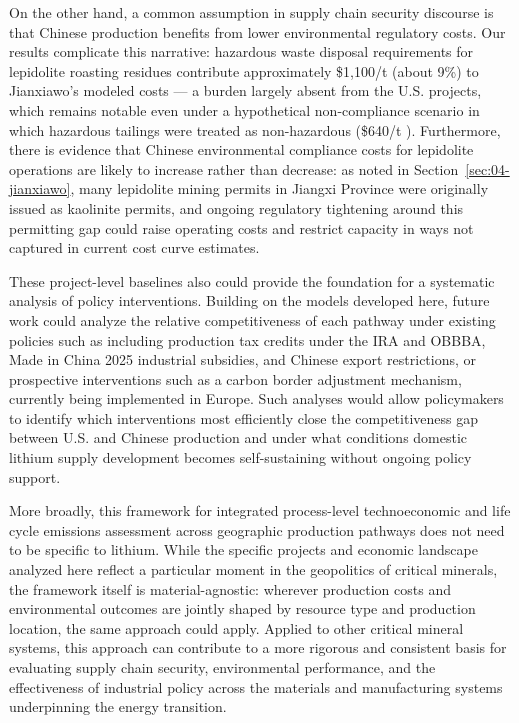\documentclass{article}
\renewcommand\_{\textunderscore\allowbreak}
\begin{document}
On the other hand, a common assumption in supply chain security discourse is that Chinese production benefits from lower environmental regulatory costs. Our results complicate this narrative: hazardous waste disposal requirements for lepidolite roasting residues contribute approximately \$1,100/t  (about 9\%) to Jianxiawo's modeled costs — a burden largely absent from the U.S. projects, which remains notable even under a hypothetical non-compliance scenario in which hazardous tailings were treated as non-hazardous (\$640/t ). Furthermore, there is evidence that Chinese environmental compliance costs for lepidolite operations are likely to increase rather than decrease: as noted in Section~\ref{sec:04-jianxiawo}, many lepidolite mining permits in Jiangxi Province were originally issued as kaolinite permits, and ongoing regulatory tightening around this permitting gap \cite{benchmarkteamCATLSuspendsOperations, zhangChinaHasDomestic2025} could raise operating costs and restrict capacity in ways not captured in current cost curve estimates.

These project-level baselines also could provide the foundation for a systematic analysis of policy interventions. Building on the models developed here, future work could analyze the relative competitiveness of each pathway under existing policies such as including production tax credits under the IRA and OBBBA, Made in China 2025 industrial subsidies, and Chinese export restrictions, or prospective interventions such as a carbon border adjustment mechanism, currently being implemented in Europe. Such analyses would allow policymakers to identify which interventions most efficiently close the competitiveness gap between U.S. and Chinese production and under what conditions domestic lithium supply development becomes self-sustaining without ongoing policy support.

More broadly, this framework for integrated process-level technoeconomic and life cycle emissions assessment across geographic production pathways does not need to be specific to lithium. While the specific projects and economic landscape analyzed here reflect a particular moment in the geopolitics of critical minerals, the framework itself is material-agnostic: wherever production costs and environmental outcomes are jointly shaped by resource type and production location, the same approach could apply. Applied to other critical mineral systems, this approach can contribute to a more rigorous and consistent basis for evaluating supply chain security, environmental performance, and the effectiveness of industrial policy across the materials and manufacturing systems underpinning the energy transition.
\end{document}
